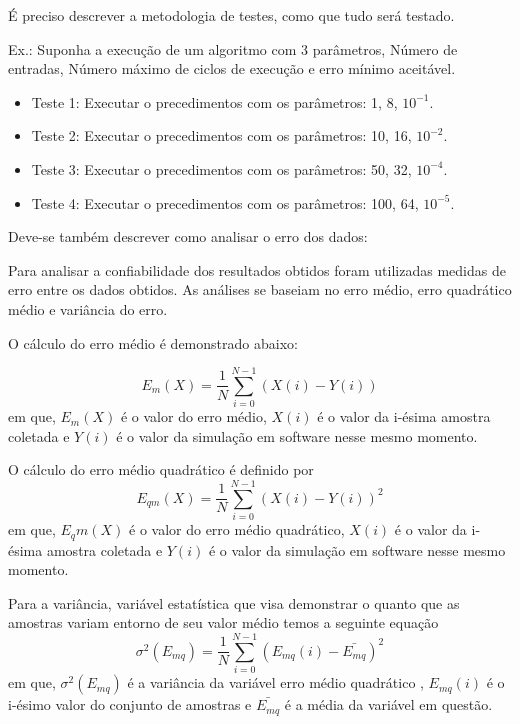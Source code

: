 \documentclass[
	12pt,				%
	openright,			%
	oneside,			%
	a4paper,			%
	brazil,				%
	]{abntex2}
\begin{document}
   É preciso descrever a metodologia de testes, como que tudo será testado.
   
   Ex.:
   Suponha a execução de um algoritmo com 3 parâmetros, Número de entradas, Número máximo de ciclos de execução e erro mínimo aceitável.
   \begin{itemize}
       \item Teste 1: Executar o precedimentos com os parâmetros: 1, 8, $10^{-1}$.
       \item Teste 2: Executar o precedimentos com os parâmetros: 10, 16, $10^{-2}$.
       \item Teste 3: Executar o precedimentos com os parâmetros: 50, 32, $10^{-4}$.
       \item Teste 4: Executar o precedimentos com os parâmetros: 100, 64, $10^{-5}$.
   \end{itemize}
   Deve-se também descrever como analisar o erro dos dados:
   
   Para analisar a confiabilidade dos resultados obtidos foram utilizadas medidas de erro entre os dados obtidos. As análises se baseiam no erro médio, erro quadrático médio e variância do erro.

    O cálculo do erro médio é demonstrado abaixo:

    \begin{equation}
    E_{m}(X) = \frac{1}{N}  \sum_{i=0}^{N-1}(X(i)-Y(i))
    \end{equation}
    em que, $E_m(X)$ é o valor do erro médio, $X(i)$ é o valor da i-ésima amostra coletada e $Y(i)$ é o valor da simulação em software nesse mesmo momento.

    O cálculo do erro médio quadrático é definido por 
    \begin{equation}
    E_{qm}(X) = \frac{1}{N}  \sum_{i=0}^{N-1}(X(i)-Y(i))^{2}
    \end{equation}
    em que, $E_qm(X)$ é o valor do erro médio quadrático, $X(i)$ é o valor da i-ésima amostra coletada e $Y(i)$ é o valor da simulação em software nesse mesmo momento.

    Para a variância, variável estatística que visa demonstrar o quanto que as amostras variam entorno de seu valor médio temos a seguinte equação
    \begin{equation}
    \sigma^{2}(E_{mq}) = \frac{1}{N}  \sum_{i=0}^{N-1}(E_{mq}(i)-\bar{E_{mq}})^{2}
    \end{equation}
    em que, $\sigma^2(E_{mq})$ é a variância da variável erro médio quadrático , $E_{mq}(i)$ é o i-ésimo valor do conjunto de amostras e $\bar{E_{mq}}$ é a média da variável em questão.
    
\end{document}
